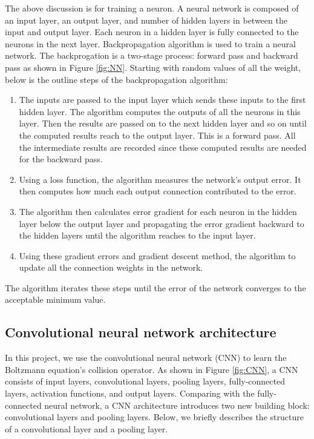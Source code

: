 \documentclass{article}
\begin{document}
The above discussion is for training a neuron. A neural network is composed of an input layer, an output layer, and number of hidden layers in between the input and output layer. Each neuron in a hidden layer is fully connected to the neurons in the next layer. Backpropagation algorithm is used to train a neural network. The backprogation is a two-stage process: forward pass and backward pass as shown in Figure \ref{fig:NN}. Starting with random values of all the weight, below is the outline steps of the backpropagation algorithm:
\begin{enumerate}
\item The inputs are passed to the input layer which sends these inputs to the first hidden layer. The algorithm computes the outputs of all the neurons in this layer. Then the results are passed on to the next hidden layer and so on until the computed results reach to the output layer. This is a forward pass. All the intermediate results are recorded since these computed results are needed for the backward pass.
\item Using a loss function, the algorithm measures the network's output error. It then computes how much each output connection contributed to the error.
\item The algorithm then calculates error gradient for each neuron in the hidden layer below the output layer and propagating the error gradient backward to the hidden layers until the algorithm reaches to the input layer.
\item Using these gradient errors and gradient descent method, the algorithm to update all the connection weights in the network. 
\end{enumerate}
The algorithm iterates these steps until the error of the network converges to the acceptable minimum value.

\subsection{Convolutional neural network architecture} \label{CNN}
In this project, we use the convolutional neural network (CNN) to learn the Boltzmann equation's collision operator. As shown in Figure \ref{fig:CNN}, a CNN consists of input layers, convolutional layers, pooling layers, fully-connected layers, activation functions, and output layers. Comparing with the fully-connected neural network, a CNN architecture introduces two new building block: convolutional layers and pooling layers. Below, we briefly describes the structure of a convolutional layer and a pooling layer.
\end{document}
